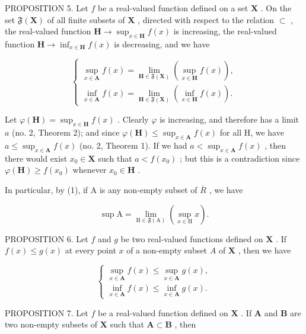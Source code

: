 PROPOSITION 5. Let \(f\) be a real-valued function defined on a set \(\mathbf{X}\) . On the set \(\mathfrak{F}(\mathbf{X})\) of all finite subsets of \(\mathbf{X}\) , directed with respect to the relation \(\subset\) , the real-valued function \(\mathbf{H} \to \sup_{x \in \mathbf{H}} f(x)\) is increasing, the real-valued function \(\mathbf{H} \to \inf_{x \in \mathbf{H}} f(x)\) is decreasing, and we have

\[
\left\{ \begin{array}{l} \sup _ {x \in \mathbf {A}} f (x) = \lim _ {\mathbf {H} \in \mathfrak {F} (\mathbf {X})} (\sup _ {x \in \mathbf {H}} f (x)), \\ \inf _ {x \in \mathbf {A}} f (x) = \lim _ {\mathbf {H} \in \mathfrak {F} (\mathbf {X})} (\inf _ {x \in \mathbf {H}} f (x)). \end{array} \right.\tag{3}
\]

Let \(\varphi(\mathbf{H}) = \sup_{x \in \mathbf{H}} f(x)\) . Clearly \(\varphi\) is increasing, and therefore has a limit \(a\) (no. 2, Theorem 2); and since \(\varphi(\mathbf{H}) \leqslant \sup_{x \in \mathbf{A}} f(x)\) for all H, we have \(a \leqslant \sup_{x \in \mathbf{A}} f(x)\) (no. 2, Theorem 1). If we had \(a < \sup_{x \in \mathbf{A}} f(x)\) , then there would exist \(x_0 \in \mathbf{X}\) such that \(a < f(x_0)\) ; but this is a contradiction since \(\varphi(\mathbf{H}) \geqslant f(x_0)\) whenever \(x_0 \in \mathbf{H}\) .

In particular, by (1), if A is any non-empty subset of \(\overline{R}\) , we have

\[
\sup \mathrm{A} = \lim _ {\mathrm{H} \in \mathfrak {F} (\mathrm{A})} (\sup _ {x \in \mathrm{H}} x).\tag{4}
\]

PROPOSITION 6. Let \(f\) and \(g\) be two real-valued functions defined on \(\mathbf{X}\) . If \(f(x) \leqslant g(x)\) at every point \(x\) of a non-empty subset \(A\) of \(\mathbf{X}\) , then we have

\[
\left\{ \begin{array}{l} \sup _ {x \in \mathbf {A}} f (x) \leqslant \sup _ {x \in \mathbf {A}} g (x), \\ \inf _ {x \in \mathbf {A}} f (x) \leqslant \inf _ {x \in \mathbf {A}} g (x). \end{array} \right.\tag{5}
\]

PROPOSITION 7. Let \(f\) be a real-valued function defined on \(\mathbf{X}\) . If \(\mathbf{A}\) and \(\mathbf{B}\) are two non-empty subsets of \(\mathbf{X}\) such that \(\mathbf{A} \subset \mathbf{B}\) , then

